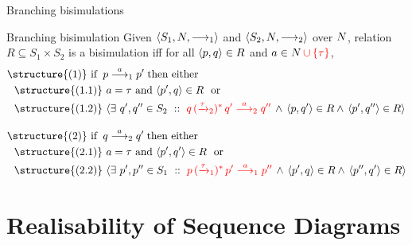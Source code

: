 \documentclass[aspectratio=169]{beamer}
\begin{document}
\begin{slide}{Branching bisimulations}
\small
{}


\begin{block}{Branching bisimulation}
Given  $\mathopen{\langle}S_1, N,  \longrightarrow_1\mathclose{\rangle}$  and $\mathopen{\langle}S_2, N, \longrightarrow_2\mathclose{\rangle}$ over $N$,
relation $R \subseteq S_1 \times S_2$ is a \alert{bisimulation} iff for all $\mathopen{\langle}p,q\mathclose{\rangle} \in R$ and $a \in N\,\textcolor{red}{\cup\left\{ \tau \right\}}$,
%
\begin{align*}\small
&\text{\structure{(1)} if}\; \;   p \rtran{a}_1 p'\; \text{then either}
  \\&~~
  \text{\structure{(1.1)}~} a=\tau \text{~and~}\pair{p',q}\in R \text{~~or}
  \\&~~
  \text{\structure{(1.2)}~}
    \rcb{\exists}{q',q'' \in S_2}{}{\rdb{q \,(\trans{\tau}_2)^{*}\,q' \tran{a}_2  q''}\, \e\,
    \pair{p,q'} \in R \e\,
    \pair{p',q''} \in R} \\[3mm]
&\text{\structure{(2)} if}\; \;   q \rtran{a}_2 q'\; \text{then either}
  \\&~~
  \text{\structure{(2.1)}~} a=\tau \text{~and~}\pair{p',q'}\in R \text{~~or}
  \\&~~
  \text{\structure{(2.2)}~}
    \rcb{\exists}{p',p'' \in S_1}{}{\rdb{p \,(\trans{\tau}_1)^{*}\,p' \tran{a}_1  p''}\, \e\,
    \pair{p',q} \in R \e\,
    \pair{p'',q'} \in R}
\end{align*}
\end{block}
\end{slide}




\section{Realisability of Sequence Diagrams}
\end{document}
